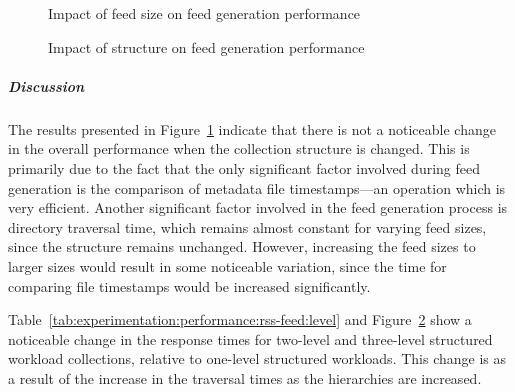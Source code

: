 \tablespacing

\bodyspacing


\begin{figure}
 \centering
 \framebox[\textwidth]{
 }
\caption[Impact of feed size on feed generation]{Impact of feed size on feed generation performance}
 \label{fig:experimentation:performance:rss-feed:feed-size}
\end{figure}


\begin{figure}
 \centering
 \framebox[\textwidth]{%

 }
\caption[Impact of structure on feed generation]{Impact of structure on feed generation performance}
 \label{fig:experimentation:performance:rss-feed:level}
\end{figure}


\subparagraph{Discussion}

The results presented in Figure~\ref{fig:experimentation:performance:rss-feed:feed-size} indicate that there is not a noticeable change in the overall performance when the collection structure is changed. This is primarily due to the fact that the only significant factor involved during feed generation is the comparison of metadata file timestamps---an operation which is very efficient. Another significant factor involved in the feed generation process is directory traversal time, which remains almost constant for varying feed sizes, since the structure remains unchanged. However, increasing the feed sizes to larger sizes would result in some noticeable variation, since the time for comparing file timestamps would be increased significantly.

Table~\ref{tab:experimentation:performance:rss-feed:level} and Figure~\ref{fig:experimentation:performance:rss-feed:level} show a noticeable change in the response times for two-level and three-level structured workload collections, relative to one-level structured workloads. This change is as a result of the increase in the traversal times as the hierarchies are increased.

